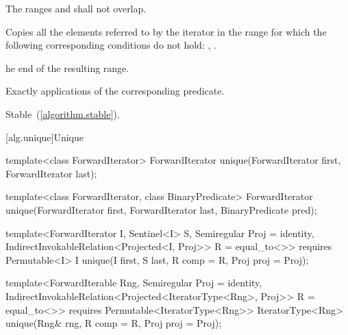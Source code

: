 \begin{itemdescr}
\pnum
\requires
The ranges
and
shall not overlap.

\pnum
\effects
Copies all the elements referred to by the iterator
in the range
for which the following corresponding conditions do not hold:
,
.

\pnum
\returns
{}he end of the resulting range.

\pnum
\complexity
Exactly
applications of the corresponding predicate.

\pnum
\remarks Stable~(\ref{algorithm.stable}).
\end{itemdescr}

[alg.unique]{Unique}

%
\begin{removedblock}
\begin{itemdecl}
template<class ForwardIterator>
  ForwardIterator unique(ForwardIterator first, ForwardIterator last);

template<class ForwardIterator, class BinaryPredicate>
  ForwardIterator unique(ForwardIterator first, ForwardIterator last,
                         BinaryPredicate pred);
\end{itemdecl}
\end{removedblock}
\begin{addedblock}
\begin{itemdecl}
template<ForwardIterator I, Sentinel<I> S, Semiregular Proj = identity,
    IndirectInvokableRelation<Projected<I, Proj>> R = equal_to<>>
  requires Permutable<I>
  I unique(I first, S last, R comp = R{}, Proj proj = Proj{});

template<ForwardIterable Rng, Semiregular Proj = identity,
    IndirectInvokableRelation<Projected<IteratorType<Rng>, Proj>> R = equal_to<>>
  requires Permutable<IteratorType<Rng>>
  IteratorType<Rng>
    unique(Rng& rng, R comp = R{}, Proj proj = Proj{});
\end{itemdecl}
\end{addedblock}

